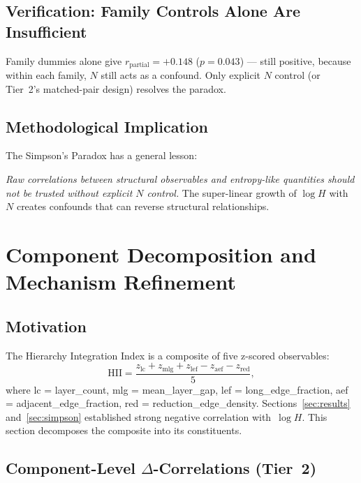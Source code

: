 \documentclass[entropy,article,submit,pdftex,moreauthors]{Definitions/mdpi}
\begin{document}
\subsection{Verification: Family Controls Alone Are Insufficient}

Family dummies alone give $r_\text{partial} = +0.148$ ($p = 0.043$) --- still positive, because within each family, $N$ still acts as a confound. Only explicit $N$ control (or Tier~2's matched-pair design) resolves the paradox.

\subsection{Methodological Implication}

The Simpson's Paradox has a general lesson:

\emph{Raw correlations between structural observables and entropy-like quantities should not be trusted without explicit $N$ control.} The super-linear growth of $\log H$ with $N$ creates confounds that can reverse structural relationships.

\section{Component Decomposition and Mechanism Refinement}\label{sec:decomposition}

\subsection{Motivation}

The Hierarchy Integration Index is a composite of five z-scored observables:
\begin{equation}
    \text{HII} = \frac{z_\text{lc} + z_\text{mlg} + z_\text{lef} - z_\text{aef} - z_\text{red}}{5},
    \label{eq:hii_expanded}
\end{equation}
where lc = layer\_count, mlg = mean\_layer\_gap, lef = long\_edge\_fraction, aef = adjacent\_edge\_fraction, red = reduction\_edge\_density. Sections~\ref{sec:results} and~\ref{sec:simpson} established strong negative correlation with~$\log H$. This section decomposes the composite into its constituents.

\subsection{Component-Level $\Delta$-Correlations (Tier~2)}
\end{document}
